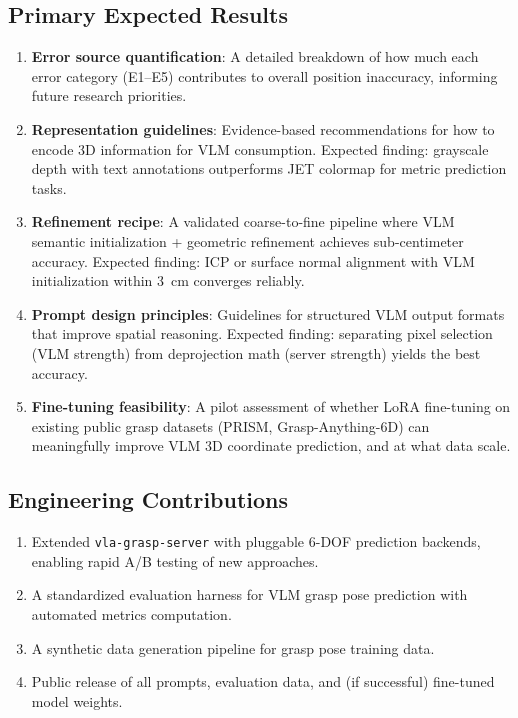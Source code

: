 \documentclass[11pt,a4paper]{article}
\begin{document}
\subsection{Primary Expected Results}

\begin{enumerate}[leftmargin=*]
    \item \textbf{Error source quantification}: A detailed breakdown of how much each error category (E1--E5) contributes to overall position inaccuracy, informing future research priorities.

    \item \textbf{Representation guidelines}: Evidence-based recommendations for how to encode 3D information for VLM consumption. Expected finding: grayscale depth with text annotations outperforms JET colormap for metric prediction tasks.

    \item \textbf{Refinement recipe}: A validated coarse-to-fine pipeline where VLM semantic initialization + geometric refinement achieves sub-centimeter accuracy. Expected finding: ICP or surface normal alignment with VLM initialization within 3~cm converges reliably.

    \item \textbf{Prompt design principles}: Guidelines for structured VLM output formats that improve spatial reasoning. Expected finding: separating pixel selection (VLM strength) from deprojection math (server strength) yields the best accuracy.

    \item \textbf{Fine-tuning feasibility}: A pilot assessment of whether LoRA fine-tuning on existing public grasp datasets (PRISM, Grasp-Anything-6D) can meaningfully improve VLM 3D coordinate prediction, and at what data scale.
\end{enumerate}

\subsection{Engineering Contributions}

\begin{enumerate}[leftmargin=*]
    \item Extended \texttt{vla-grasp-server} with pluggable 6-DOF prediction backends, enabling rapid A/B testing of new approaches.
    \item A standardized evaluation harness for VLM grasp pose prediction with automated metrics computation.
    \item A synthetic data generation pipeline for grasp pose training data.
    \item Public release of all prompts, evaluation data, and (if successful) fine-tuned model weights.
\end{enumerate}
\end{document}
